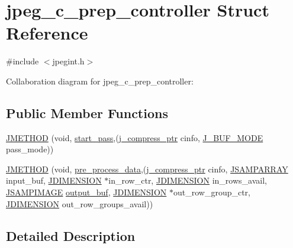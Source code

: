 \hypertarget{structjpeg__c__prep__controller}{}\section{jpeg\+\_\+c\+\_\+prep\+\_\+controller Struct Reference}
\label{structjpeg__c__prep__controller}


{\ttfamily \#include $<$jpegint.\+h$>$}



Collaboration diagram for jpeg\+\_\+c\+\_\+prep\+\_\+controller\+:
\subsection*{Public Member Functions}
\begin{DoxyCompactItemize}
\item 
\mbox{\hyperlink{structjpeg__c__prep__controller_af2fb43bbf035ffe6b1a28fb2382db63d}{J\+M\+E\+T\+H\+OD}} (void, \mbox{\hyperlink{jddctmgr_8c_a1964f006adb8fb80f57e455f6452aec1}{start\+\_\+pass}},(\mbox{\hyperlink{jpeglib_8h_add2a072c54e3a51550f4975f7ddb91e7}{j\+\_\+compress\+\_\+ptr}} cinfo, \mbox{\hyperlink{jpegint_8h_a1f0803342372ac62b6903c399399c874}{J\+\_\+\+B\+U\+F\+\_\+\+M\+O\+DE}} pass\+\_\+mode))
\item 
\mbox{\hyperlink{structjpeg__c__prep__controller_a84100e06666ea90e6734dce2a10af554}{J\+M\+E\+T\+H\+OD}} (void, \mbox{\hyperlink{jcprepct_8c_a540c9d0777b0f72437600723ff78d9eb}{pre\+\_\+process\+\_\+data}},(\mbox{\hyperlink{jpeglib_8h_add2a072c54e3a51550f4975f7ddb91e7}{j\+\_\+compress\+\_\+ptr}} cinfo, \mbox{\hyperlink{jpeglib_8h_ac9d5d1b829ed51769db69a37271a7e91}{J\+S\+A\+M\+P\+A\+R\+R\+AY}} input\+\_\+buf, \mbox{\hyperlink{jmorecfg_8h_a04ed4674f6f1d0d50ec241531e38274f}{J\+D\+I\+M\+E\+N\+S\+I\+ON}} $\ast$in\+\_\+row\+\_\+ctr, \mbox{\hyperlink{jmorecfg_8h_a04ed4674f6f1d0d50ec241531e38274f}{J\+D\+I\+M\+E\+N\+S\+I\+ON}} in\+\_\+rows\+\_\+avail, \mbox{\hyperlink{jpeglib_8h_a4bf858e4d42202287e786bdec2f3b62b}{J\+S\+A\+M\+P\+I\+M\+A\+GE}} \mbox{\hyperlink{jdct_8h_ad7e4660a191b1a791748dd44d5a7a0ec}{output\+\_\+buf}}, \mbox{\hyperlink{jmorecfg_8h_a04ed4674f6f1d0d50ec241531e38274f}{J\+D\+I\+M\+E\+N\+S\+I\+ON}} $\ast$out\+\_\+row\+\_\+group\+\_\+ctr, \mbox{\hyperlink{jmorecfg_8h_a04ed4674f6f1d0d50ec241531e38274f}{J\+D\+I\+M\+E\+N\+S\+I\+ON}} out\+\_\+row\+\_\+groups\+\_\+avail))
\end{DoxyCompactItemize}


\subsection{Detailed Description}


